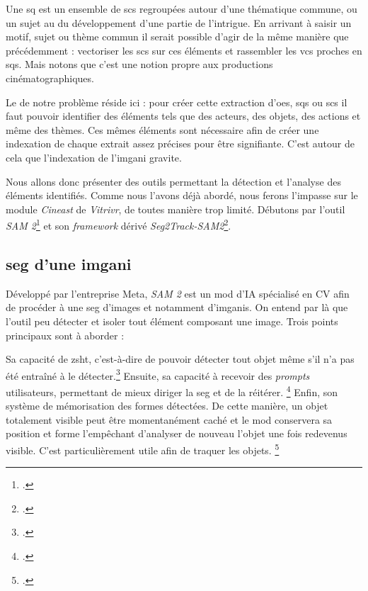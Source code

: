 Une \gls{sq} est un ensemble de \glspl{sc} regroupées autour d'une thématique commune, ou un sujet au \coeur du développement d'une partie de l'intrigue. En arrivant à saisir un motif, sujet ou thème commun il serait possible d'agir de la même manière que précédemment : vectoriser les \glspl{sc} sur ces éléments et rassembler les \gls{vcs} proches en \glspl{sq}. Mais notons que c'est une notion propre aux productions cinématographiques.\newline

Le \coeur de notre problème réside ici : pour créer cette extraction d'\glspl{oe}, \glspl{sq} ou \glspl{sc} il faut pouvoir identifier des éléments tels que des acteurs, des objets, des actions et même des thèmes. Ces mêmes éléments sont nécessaire afin de créer une indexation de chaque extrait assez précises pour être signifiante. C'est autour de cela que l'indexation de l'\gls{imgani} gravite.

Nous allons donc présenter des outils permettant la détection et l'analyse des éléments identifiés. Comme nous l'avons déjà abordé, nous ferons l'impasse sur \newline le module \textit{Cineast} de \textit{Vitrivr}, de toutes manière trop limité. Débutons par l'outil \textit{SAM 2}\footcite{SAM2Segment} et son \textit{framework} dérivé \textit{Seg2Track-SAM2}\footcite{mendoncaSeg2TrackSAM2SAM2basedMultiobject2025a}.

\subsection{\Gls{seg} d'une \gls{imgani}}

\label{SAM2} Développé par l'entreprise Meta, \textit{SAM 2} est un \gls{mod} d'\gls{IA} spécialisé en \gls{CV} afin de procéder à une \gls{seg} d'images et notamment d'\glspl{imgani}. On entend par là que l'outil peu détecter et isoler tout élément composant une image. Trois points principaux sont à aborder :

Sa capacité de \gls{zsht}, c'est-à-dire de pouvoir détecter tout objet même s'il n'a pas été entraîné à le détecter.\footcite[p.8 à 10]{raviSAM2SEGMENT2025} Ensuite, sa capacité à recevoir des \textit{prompts} utilisateurs, permettant de mieux diriger la \gls{seg} et de la réitérer. \footcite[p.3 à 4]{raviSAM2SEGMENT2025} Enfin, son système de mémorisation des formes détectées. De cette manière, un objet totalement visible peut être momentanément caché et le \gls{mod} conservera sa position et forme l’empêchant d'analyser de nouveau l'objet une fois redevenus visible. C'est particulièrement utile afin de traquer les objets. \footcites[p.4 à 5]{raviSAM2SEGMENT2025}{SAM2Segment}

